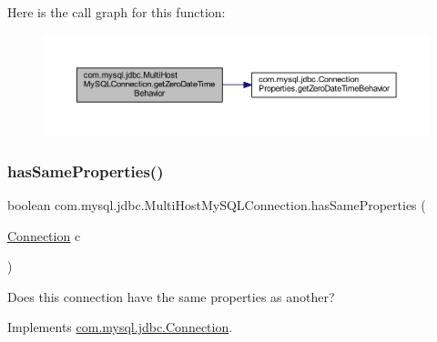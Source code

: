Here is the call graph for this function\+:
\nopagebreak
\begin{figure}[H]
\begin{center}
\leavevmode
\includegraphics[width=350pt]{classcom_1_1mysql_1_1jdbc_1_1_multi_host_my_s_q_l_connection_a7f3732fae7bbb72f1fdccbe5fe5931bd_cgraph}
\end{center}
\end{figure}
\mbox{\label{classcom_1_1mysql_1_1jdbc_1_1_multi_host_my_s_q_l_connection_a6d1ba78a6ad110ec1027fa341ceef1e5}} 
\subsubsection{\texorpdfstring{has\+Same\+Properties()}{hasSameProperties()}}
{\footnotesize\ttfamily boolean com.\+mysql.\+jdbc.\+Multi\+Host\+My\+S\+Q\+L\+Connection.\+has\+Same\+Properties (\begin{DoxyParamCaption}\item[{\mbox{\hyperlink{interfacecom_1_1mysql_1_1jdbc_1_1_connection}{Connection}}}]{c }\end{DoxyParamCaption})}

Does this connection have the same properties as another? 

Implements \mbox{\hyperlink{interfacecom_1_1mysql_1_1jdbc_1_1_connection_aa075b035aedfaf2d59114dde53cfc3de}{com.\+mysql.\+jdbc.\+Connection}}.

